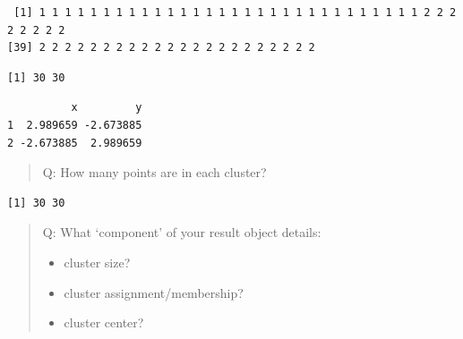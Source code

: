 \documentclass[
  letterpaper,
  DIV=11,
  numbers=noendperiod]{scrartcl}
\newenvironment{Shaded}{\begin{snugshade}}{\end{snugshade}}
\newcommand{\CommentTok}[1]{\textcolor[rgb]{0.37,0.37,0.37}{#1}}
\newcommand{\NormalTok}[1]{\textcolor[rgb]{0.00,0.23,0.31}{#1}}
\newcommand{\SpecialCharTok}[1]{\textcolor[rgb]{0.37,0.37,0.37}{#1}}
\begin{document}
\begin{Shaded}
\end{Shaded}

\begin{verbatim}
 [1] 1 1 1 1 1 1 1 1 1 1 1 1 1 1 1 1 1 1 1 1 1 1 1 1 1 1 1 1 1 1 2 2 2 2 2 2 2 2
[39] 2 2 2 2 2 2 2 2 2 2 2 2 2 2 2 2 2 2 2 2 2 2
\end{verbatim}

\begin{Shaded}
\end{Shaded}

\begin{verbatim}
[1] 30 30
\end{verbatim}

\begin{Shaded}
\end{Shaded}

\begin{verbatim}
          x         y
1  2.989659 -2.673885
2 -2.673885  2.989659
\end{verbatim}

\begin{quote}
Q: How many points are in each cluster?
\end{quote}

\begin{Shaded}
\end{Shaded}

\begin{verbatim}
[1] 30 30
\end{verbatim}

\begin{quote}
Q: What `component' of your result object details:

\begin{itemize}
\item
  cluster size?
\item
  cluster assignment/membership?
\item
  cluster center?
\end{itemize}
\end{quote}
\end{document}

